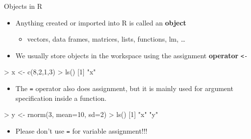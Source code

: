 \documentclass[
  ignorenonframetext,
]{beamer}
\newenvironment{Shaded}{\begin{snugshade}}{\end{snugshade}}
\newcommand{\AttributeTok}[1]{\textcolor[rgb]{0.77,0.63,0.00}{#1}}
\newcommand{\DecValTok}[1]{\textcolor[rgb]{0.00,0.00,0.81}{#1}}
\newcommand{\FunctionTok}[1]{\textcolor[rgb]{0.00,0.00,0.00}{#1}}
\newcommand{\NormalTok}[1]{#1}
\newcommand{\OtherTok}[1]{\textcolor[rgb]{0.56,0.35,0.01}{#1}}
\newcommand{\SpecialCharTok}[1]{\textcolor[rgb]{0.00,0.00,0.00}{#1}}
\newcommand{\StringTok}[1]{\textcolor[rgb]{0.31,0.60,0.02}{#1}}
\providecommand{\tightlist}{%
  \setlength{\itemsep}{0pt}\setlength{\parskip}{0pt}}
\begin{document}
\begin{frame}[fragile]{Objects in R}
\protect\hypertarget{objects-in-r}{}
\begin{itemize}[<+->]
\tightlist
\item
  Anything created or imported into R is called an \textbf{object}

  \begin{itemize}[<+->]
  \tightlist
  \item
    vectors, data frames, matrices, lists, functions, lm, \ldots{}
  \end{itemize}
\item
  We usually store objects in the workspace using the assignment
  \textbf{operator} \texttt{\textless{}-}
\end{itemize}

\begin{Shaded}
\begin{Highlighting}[]
\SpecialCharTok{\textgreater{}}\NormalTok{ x }\OtherTok{\textless{}{-}} \FunctionTok{c}\NormalTok{(}\DecValTok{8}\NormalTok{,}\DecValTok{2}\NormalTok{,}\DecValTok{1}\NormalTok{,}\DecValTok{3}\NormalTok{)}
\SpecialCharTok{\textgreater{}} \FunctionTok{ls}\NormalTok{()}
\NormalTok{[}\DecValTok{1}\NormalTok{] }\StringTok{"x"}
\end{Highlighting}
\end{Shaded}

\begin{itemize}[<+->]
\tightlist
\item
  The \texttt{=} operator also does assignment, but it is mainly used
  for argument specification inside a function.
\end{itemize}

\begin{Shaded}
\begin{Highlighting}[]
\SpecialCharTok{\textgreater{}}\NormalTok{ y }\OtherTok{\textless{}{-}} \FunctionTok{rnorm}\NormalTok{(}\DecValTok{3}\NormalTok{, }\AttributeTok{mean=}\DecValTok{10}\NormalTok{, }\AttributeTok{sd=}\DecValTok{2}\NormalTok{)}
\SpecialCharTok{\textgreater{}} \FunctionTok{ls}\NormalTok{()}
\NormalTok{[}\DecValTok{1}\NormalTok{] }\StringTok{"x"} \StringTok{"y"}
\end{Highlighting}
\end{Shaded}

\begin{itemize}[<+->]
\tightlist
\item
  Please don't use \texttt{=} for variable assignment!!!
\end{itemize}
\end{frame}
\end{document}
